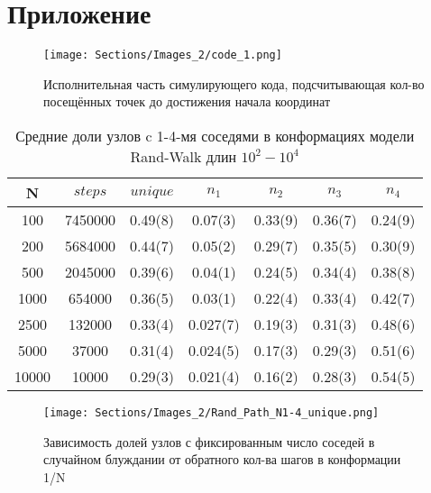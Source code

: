 \section{Приложение}

\begin{figure}[h]
    \centering
    \texttt{[image: Sections/Images\_2/code\_1.png]}
    \caption{Исполнительная часть симулирующего кода, подсчитывающая кол-во посещённых точек до достижения начала координат}
    \label{fig:code}
\end{figure}

\begin{table}[h]
    \centering
    \begin{tabular}{|c|c|c|c|c|c|c|}
        \hline
        N & $steps$ & $unique$ & $n_{1}$ & $n_{2}$ & $n_{3}$ & $n_{4}$ \\ \hline
        100 & 7450000 & 0.49(8) & 0.07(3) & 0.33(9) & 0.36(7) & 0.24(9) \\ \hline
        200 & 5684000 & 0.44(7) & 0.05(2) & 0.29(7) & 0.35(5) & 0.30(9) \\ \hline
        500 & 2045000 & 0.39(6) & 0.04(1) & 0.24(5) & 0.34(4) & 0.38(8) \\ \hline
        1000 & 654000 & 0.36(5) & 0.03(1) & 0.22(4) & 0.33(4) & 0.42(7) \\ \hline
        2500 & 132000 & 0.33(4) & 0.027(7) & 0.19(3) & 0.31(3) & 0.48(6)  \\ \hline
        5000 & 37000 & 0.31(4) & 0.024(5) & 0.17(3) & 0.29(3) & 0.51(6) \\ \hline
        10000 & 10000 & 0.29(3) & 0.021(4) & 0.16(2) & 0.28(3) & 0.54(5) \\ \hline
    \end{tabular}
    \caption{Средние доли узлов c 1-4-мя соседями в конформациях модели Rand-Walk длин $10^{2}-10^{4}$}
    \label{tab:Ran_Walk_neigh}
\end{table}

\begin{figure}[]
    \centering
    \caption{Зависимость долей узлов с фиксированным число соседей в случайном блуждании от обратного кол-ва шагов в конформации 1/N}
    \texttt{[image: Sections/Images\_2/Rand\_Path\_N1-4\_unique.png]}
    \label{fig:Rand_Path_N1_4}
\end{figure}
